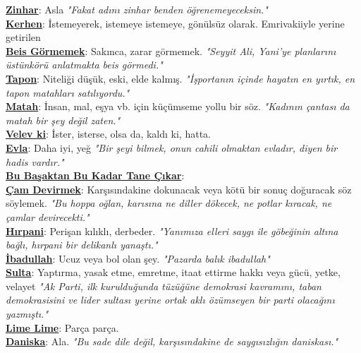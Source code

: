 \documentclass[twocolumn]{article}
\begin{document}
\noindent \underline{\textbf{Zinhar}}:\textsf{ Asla }\textit{"Fakat adını zinhar benden öğrenemeyeceksin." } \\
\noindent \underline{\textbf{Kerhen}}:\textsf{ İstemeyerek, istemeye istemeye, gönülsüz olarak. Emrivakiiyle yerine getirilen }\textit{ } \\
\noindent \underline{\textbf{Beis Görmemek}}:\textsf{ Sakınca, zarar görmemek. }\textit{"Seyyit Ali, Yani'ye planlarını üstünkörü anlatmakta beis görmedi." } \\
\noindent \underline{\textbf{Tapon}}:\textsf{ Niteliği düşük, eski, elde kalmış. }\textit{"İşportanın içinde hayatın en yırtık, en tapon matahları satılıyordu." } \\
\noindent \underline{\textbf{Matah}}:\textsf{ İnsan, mal, eşya vb. için küçümseme yollu bir söz. }\textit{"Kadının çantası da matah bir şey değil zaten."} \\
\noindent \underline{\textbf{Velev ki}}:\textsf{ İster, isterse, olsa da, kaldı ki, hatta. }\textit{ } \\
\noindent \underline{\textbf{Evla}}:\textsf{ Daha iyi, yeğ }\textit{"Bir şeyi bilmek, onun cahili olmaktan evladır, diyen bir hadis vardır."} \\
\noindent \underline{\textbf{Bu Başaktan Bu Kadar Tane Çıkar}}:\textsf{ }\textit{ } \\
\noindent \underline{\textbf{Çam Devirmek}}:\textsf{ Karşısındakine dokunacak veya kötü bir sonuç doğuracak söz söylemek. }\textit{"Bu hoppa oğlan, karısına ne diller dökecek, ne potlar kıracak, ne çamlar devirecekti."} \\
\noindent \underline{\textbf{Hırpani}}:\textsf{ Perişan kılıklı, derbeder. }\textit{"Yanımıza elleri saygı ile göbeğinin altına bağlı, hırpani bir delikanlı yanaştı."} \\
\noindent \underline{\textbf{İbadullah}}:\textsf{ Ucuz veya bol olan şey. }\textit{"Pazarda balık ibadullah"} \\
\noindent \underline{\textbf{Sulta}}:\textsf{ Yaptırma, yasak etme, emretme, itaat ettirme hakkı veya gücü, yetke, velayet }\textit{"Ak Parti, ilk kurulduğunda tüzüğüne demokrasi kavramını, taban demokrasisini ve lider sultası yerine ortak aklı özümseyen bir parti olacağını yazmıştı."} \\
\noindent \underline{\textbf{Lime Lime}}:\textsf{ Parça parça. }\textit{ } \\
\noindent \underline{\textbf{Daniska}}:\textsf{ Ala. }\textit{"Bu sade dile değil, karşısındakine de saygısızlığın daniskası."} \\
\end{document}
